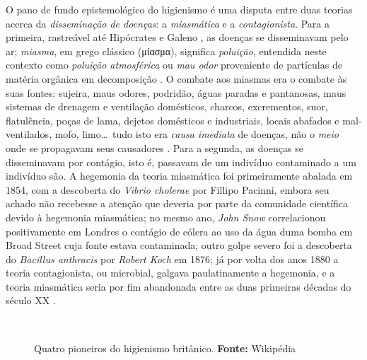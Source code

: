 O pano de fundo epistemológico do higienismo é uma disputa entre duas teorias acerca da \textit{disseminação de doenças}: a \textit{miasmática} e a \textit{contagionista}. Para a primeira, rastreável até Hipócrates e Galeno \cite{sterner_miasmic_2007}, as doenças se disseminavam pelo ar; \textit{miasma}, em grego clássico (\textgreek{μίασμα}), significa \textit{poluição}, entendida neste contexto como \textit{poluição atmosférica} ou \textit{mau odor} proveniente de partículas de matéria orgânica em decomposição \cite{mehlhorn2008encyclopedia}. O combate aos miasmas era o combate às suas fontes: sujeira, maus odores, podridão, águas paradas e pantanosas, maus sistemas de drenagem e ventilação domésticos, charcos, excrementos, suor, flatulência, poças de lama, dejetos domésticos e industriais, locais abafados e mal-ventilados, mofo, limo\dots\ tudo isto era \textit{causa imediata} de doenças, não o \textit{meio} onde se propagavam seus causadores \cite{baldwin_air_2003,halliday_miaslond_2001}. Para a segunda, as doenças se disseminavam por contágio, isto é, passavam de um indivíduo contaminado a um indivíduo são. A hegemonia da teoria miasmática foi primeiramente abalada em 1854, com a descoberta do \textit{Vibrio cholerae} por Fillipo Pacinni, embora seu achado não recebesse a atenção que deveria por parte da comunidade científica devido à hegemonia miasmática; no mesmo ano, \textit{John Snow} correlacionou positivamente em Londres o contágio de cólera ao uso da água duma bomba em Broad Street cuja fonte estava contaminada; outro golpe severo foi a descoberta do \textit{Bacillus anthracis} por \textit{Robert Koch} em 1876; já por volta dos anos 1880 a teoria contagionista, ou microbial, galgava paulatinamente a hegemonia, e a teoria miasmática seria por fim abandonada entre as duas primeiras décadas do século XX \cite{bynum_histmed_2011,mehlhorn2008encyclopedia}.

\begin{figure}[!htp]
\centering
{}
\  %
\  %
\  %
\caption{Quatro pioneiros do higienismo britânico. \textbf{Fonte:} Wikipédia}
\end{figure}


